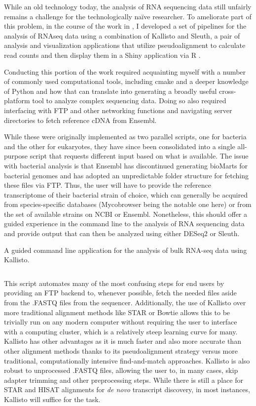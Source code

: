 While an old technology today, the analysis of RNA sequencing data still unfairly remains a challenge for the technologically na\"{i}ve researcher. To ameliorate part of this problem, in the course of the work in \citet{Saelens2022}, I developed a set of pipelines for the analysis of RNAseq data using a combination of Kallisto and Sleuth, a pair of analysis and visualization applications that utilize pseudoalignment to calculate read counts and then display them in a Shiny application via R \citep{Pimentel2017}.

Conducting this portion of the work required acquainting myself with a number of commonly used computational tools, including cmake and a deeper knowledge of Python and how that can translate into generating a broadly useful cross-platform tool to analyze complex sequencing data. Doing so also required interfacing with FTP and other networking functions and navigating server directories to fetch reference cDNA from Ensembl.

While these were originally implemented as two parallel scripts, one for bacteria and the other for eukaryotes, they have since been consolidated into a single all-purpose script that requests different input based on what is available. The issue with bacterial analysis is that Ensembl has discontinued generating bioMarts for bacterial genomes and has adopted an unpredictable folder structure for fetching these files via FTP. Thus, the user will have to provide the reference transcriptome of their bacterial strain of choice, which can generally be acquired from species-specific databases (Mycobrowser being the notable one here) or from the set of available strains on NCBI or Ensembl. Nonetheless, this should offer a guided experience in the command line to the analysis of RNA sequencing data and provide output that can then be analyzed using either DESeq2 or Sleuth.

\begin{code}
\caption{A guided command line application for the analysis of bulk RNA-seq data using Kallisto.}
\label{blinder}

\inputminted[breaklines,frame=single,fontsize=\small]{python}{source/allKallisto.py}

\end{code}

This script automates many of the most confusing steps for end users by providing an FTP backend to, whenever possible, fetch the needed files aside from the .FASTQ files from the sequencer. Additionally, the use of Kallisto over more traditional alignment methods like STAR or Bowtie allows this to be trivially run on any modern computer without requiring the user to interface with a computing cluster, which is a relatively steep learning curve for many. Kallisto has other advantages as it is much faster and also more accurate than other alignment methods thanks to its pseudoalignment strategy versus more traditional, computationally intensive find-and-match approaches. Kallisto is also robust to unprocessed .FASTQ files, allowing the user to, in many cases, skip adapter trimming and other preprocessing steps. While there is still a place for STAR and HISAT alignments for \textit{de novo} transcript discovery, in most instances, Kallisto will suffice for the task. 

